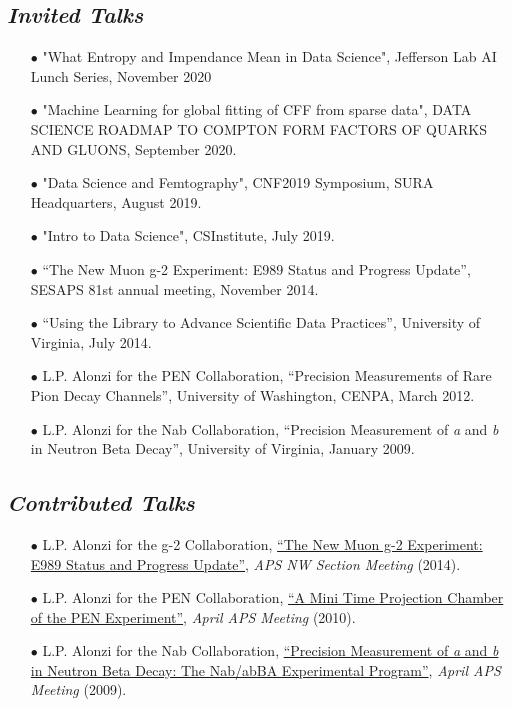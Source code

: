 \documentclass{article}[10pt]
\begin{document}
\subsection*{\emph{Invited Talks}}

\begin{itemize}
\item [$\bullet$] "What Entropy and Impendance Mean in Data Science", Jefferson Lab AI Lunch Series, November 2020
\item [$\bullet$] "Machine Learning for global fitting of CFF from sparse data​", DATA SCIENCE ROADMAP TO COMPTON FORM FACTORS OF QUARKS AND GLUONS, September 2020.
\item [$\bullet$] "Data Science and Femtography", CNF2019 Symposium, SURA Headquarters, August 2019.
\item [$\bullet$] "Intro to Data Science", CSInstitute, July 2019.
\item [$\bullet$] ``The New Muon g-2 Experiment: E989 Status and Progress Update'', SESAPS 81st annual meeting, November 2014.
\item [$\bullet$] ``Using the Library to Advance Scientific Data Practices'', University of Virginia, July 2014.
\item [$\bullet$] L.P. Alonzi for the PEN Collaboration, ``Precision Measurements of Rare Pion Decay Channels'', University of Washington, CENPA, March 2012.
\item [$\bullet$] L.P. Alonzi for the Nab Collaboration, ``Precision Measurement of \emph{a} and \emph{b} in Neutron Beta Decay'', University of Virginia, January 2009.
\end{itemize}

\subsection*{\emph{Contributed Talks}}
\begin{itemize}
\item [$\bullet$] L.P. Alonzi for the g-2 Collaboration, \href{http://pen.phys.virginia.edu/lpa2a-docs/2014-05-02-Alonzi-APSNWSection.pdf}{``The New Muon g-2 Experiment: E989 Status and Progress Update''}, \emph{APS NW Section Meeting} (2014).
\item [$\bullet$] L.P. Alonzi for the PEN Collaboration, \href{http://pen.phys.virginia.edu/talks/2010_April_APS_alonzi.pdf}{``A Mini Time Projection Chamber of the PEN Experiment''}, \emph{April APS Meeting} (2010).
\item [$\bullet$] L.P. Alonzi for the Nab Collaboration, \href{http://nab.phys.virginia.edu/slides/2009_April_APS_Alonzi.pdf}{``Precision Measurement of \emph{a} and \emph{b} in Neutron Beta Decay: The Nab/abBA Experimental Program''}, \emph{April APS Meeting} (2009).
\end{itemize}
\end{document}
